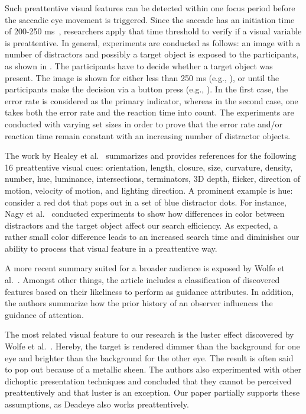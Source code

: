 \documentclass[journal]{vgtc}                %
\begin{document}
Such preattentive visual features can be detected within one focus period before the saccadic eye movement is triggered. Since the saccade has an initiation time of 200-250 ms~\cite{Healey:2012:AVM:2225054.2225226}, researchers apply that time threshold to verify if a visual variable is preattentive. In general, experiments are conducted as follows: an image with a number of distractors and possibly a target object is exposed to the participants, as shown in . The participants have to decide whether a target object was present. The image is shown for either less than 250 ms (e.g., \cite{Gutwin:2017:PPI:3025453.3025984}), or until the participants make the decision via a button press (e.g., \cite{vissearch}). In the first case, the error rate is considered as the primary indicator, whereas in the second case, one takes both the error rate and the reaction time into count. The experiments are conducted with varying set sizes in order to prove that the error rate and/or reaction time remain constant with an increasing number of distractor objects.

The work by Healey et al.~\cite{Healey:2012:AVM:2225054.2225226} summarizes and provides references for the following 16 preattentive visual cues: orientation, length, closure, size, curvature, density, number, hue, luminance, intersections, terminators, 3D depth, flicker, direction of motion, velocity of motion, and lighting direction. A prominent example is hue: consider a red dot that pops out in a set of blue distractor dots. For instance, Nagy et al.~\cite{nagy1990critical} conducted experiments to show how differences in color between distractors and the target object affect our search efficiency. As expected, a rather small color difference leads to an increased search time and diminishes our ability to process that visual feature in a preattentive way.

A more recent summary suited for a broader audience is exposed by Wolfe et al.~\cite{wolfe2017five}. Amongst other things, the article includes a classification of discovered features based on their likeliness to perform as guidance attributes. In addition, the authors summarize how the prior history of an observer influences the guidance of attention.

The most related visual feature to our research is the luster effect discovered by Wolfe et al.~\cite{wolfe1988binocularity}. Hereby, the target is rendered dimmer than the background for one eye and brighter than the background for the other eye. The result is often said to pop out because of a metallic sheen. The authors also experimented with other dichoptic presentation techniques and concluded that they cannot be perceived preattentively and that luster is an exception. Our paper partially supports these assumptions, as Deadeye also works preattentively. 
\end{document}
